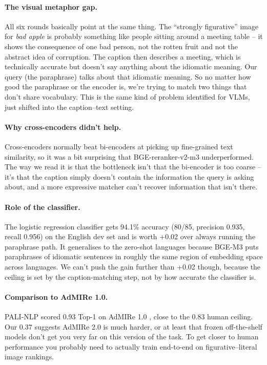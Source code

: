 \documentclass[11pt]{article}
\begin{document}
\paragraph{The visual metaphor gap.}
All six rounds basically point at the same thing. The ``strongly figurative''
image for \textit{bad apple} is probably something like people sitting around
a meeting table -- it shows the consequence of one bad person, not the rotten
fruit and not the abstract idea of corruption. The caption then describes a
meeting, which is technically accurate but doesn't say anything about the
idiomatic meaning. Our query (the paraphrase) talks about that idiomatic
meaning. So no matter how good the paraphrase or the encoder is, we're trying
to match two things that don't share vocabulary. This is the same kind of
problem \citet{yuksekgonul2023aro} identified for VLMs, just shifted
into the caption--text setting.

\paragraph{Why cross-encoders didn't help.}
Cross-encoders normally beat bi-encoders at picking up fine-grained text
similarity, so it was a bit surprising that BGE-reranker-v2-m3 underperformed.
The way we read it is that the bottleneck isn't that the bi-encoder is too
coarse -- it's that the caption simply doesn't contain the information the
query is asking about, and a more expressive matcher can't recover information
that isn't there.

\paragraph{Role of the classifier.}
The logistic regression classifier gets 94.1\% accuracy (80/85, precision
0.935, recall 0.956) on the English dev set and is worth +0.02 over always
running the paraphrase path. It generalises to the zero-shot languages because
BGE-M3 puts paraphrases of idiomatic sentences in roughly the same region of
embedding space across languages. We can't push the gain further than +0.02
though, because the ceiling is set by the caption-matching step, not by how
accurate the classifier is.

\paragraph{Comparison to AdMIRe 1.0.}
PALI-NLP scored 0.93 Top-1 on AdMIRe 1.0 \cite{semeval2025admire1}, close to
the 0.83 human ceiling. Our 0.37 suggests AdMIRe 2.0 is much harder, or at
least that frozen off-the-shelf models don't get you very far on this version
of the task. To get closer to human performance you probably need to actually
train end-to-end on figurative--literal image rankings.
\end{document}

